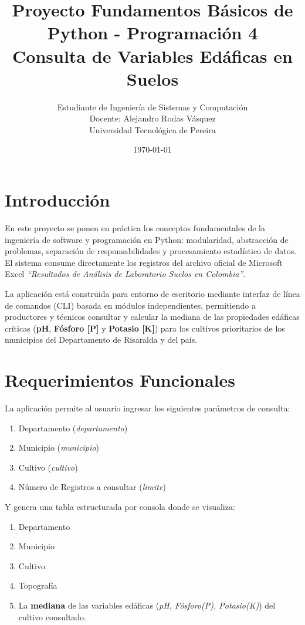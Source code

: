 \documentclass[12pt]{article}
\begin{document}
 
\title{Proyecto Fundamentos Básicos de Python - Programación 4\\Consulta de Variables Edáficas en Suelos}
\author{Estudiante de Ingeniería de Sistemas y Computación\\
Docente: Alejandro Rodas Vásquez\\
Universidad Tecnológica de Pereira}
\date{\today}

\maketitle

\section*{Introducción}
En este proyecto se ponen en práctica los conceptos fundamentales de la ingeniería de software y programación en Python: modularidad, abstracción de problemas, separación de responsabilidades y procesamiento estadístico de datos. El sistema consume directamente los registros del archivo oficial de Microsoft Excel \textit{``Resultados de Análisis de Laboratorio Suelos en Colombia''}.

La aplicación está construida para entorno de escritorio mediante interfaz de línea de comandos (CLI) basada en módulos independientes, permitiendo a productores y técnicos consultar y calcular la mediana de las propiedades edáficas críticas (\textbf{pH}, \textbf{Fósforo [P]} y \textbf{Potasio [K]}) para los cultivos prioritarios de los municipios del Departamento de Risaralda y del país.

\newpage

\section{Requerimientos Funcionales}
\label{requerimientos_funcionales}

La aplicación permite al usuario ingresar los siguientes parámetros de consulta:
\begin{enumerate}
    \item Departamento (\textit{departamento})
    \item Municipio (\textit{municipio})
    \item Cultivo (\textit{cultivo})
    \item Número de Registros a consultar (\textit{limite})
\end{enumerate}

Y genera una tabla estructurada por consola donde se visualiza:
\begin{enumerate}
    \item Departamento
    \item Municipio 
    \item Cultivo
    \item Topografía
    \item La \textbf{mediana} de las variables edáficas (\textit{pH, Fósforo(P), Potasio(K)}) del cultivo consultado.
\end{enumerate}
\end{document}
